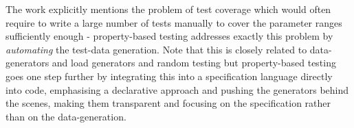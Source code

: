 
The work \cite{onggo_test-driven_2016} explicitly mentions the problem of test coverage which would often require to write a large number of tests manually to cover the parameter ranges sufficiently enough - property-based testing addresses exactly this problem by \textit{automating} the test-data generation. Note that this is closely related to data-generators \cite{gurcan_generic_2013} and load generators and random testing \cite{burnstein_practical_2010} but property-based testing goes one step further by integrating this into a specification language directly into code, emphasising a declarative approach and pushing the generators behind the scenes, making them transparent and focusing on the specification rather than on the data-generation. 